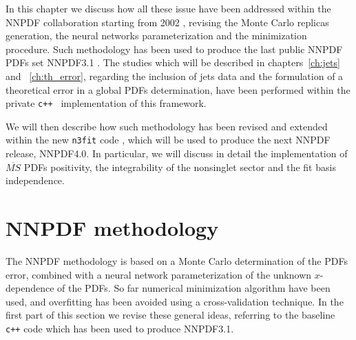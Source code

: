 %
In this chapter we discuss how all these issue have been addressed within the NNPDF collaboration
starting from 2002 \cite{Forte:2002fg}, revising the Monte Carlo replicas generation, the neural networks parameterization
and the minimization procedure. Such methodology has been used to produce the last public NNPDF PDFs set NNPDF3.1 \cite{Ball:2017nwa}
. The studies which will be described in chapters~\ref{ch:jets} and ~\ref{ch:th_error}, regarding the inclusion of jets data
and the formulation of a theoretical error in a global PDFs determination, have been performed within the private
{\tt c++ } implementation of this framework.

%
We will then describe how such methodology has been revised and extended 
within the new {\tt n3fit} code \cite{Carrazza:2019mzf}, which will be used to produce the next NNPDF release, NNPDF4.0.
In particular, we will discuss in detail the implementation of $\overline{MS}$ PDFs positivity,
the integrability of the nonsinglet sector and the fit basis independence.

\section{NNPDF methodology}
\label{sec:nnpdf_meth}

The NNPDF methodology is based on a Monte Carlo determination of the PDFs error, combined
with a neural network parameterization of the unknown $x$-dependence of the PDFs. So far numerical minimization algorithm
have been used, and overfitting has been avoided using a cross-validation technique.
In the first part of this section we revise these general ideas, referring to the baseline {\tt c++} code which
has been used to produce NNPDF3.1. 


